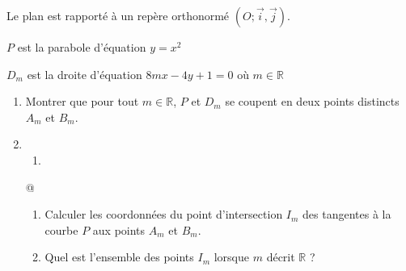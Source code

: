 
%
Le plan est rapporté à un repère orthonormé $\left(O; \vec{i}, \vec{j}\right)$.
\par
$P$ est la parabole d'équation $y=x^{2}$
\par
$D_{m}$ est la droite d'équation $8mx-4y+1=0$ où $m\in \mathbb{R}$
\begin{enumerate}
     \item
     Montrer que pour tout $m\in \mathbb{R}$, $P$ et $D_{m}$ se coupent en deux points distincts $A_{m}$ et $B_{m}$.
     \item

\begin{enumerate}
\item

\end{enumerate}@
     \begin{enumerate}[label=\alph*.]
          \item
          Calculer les coordonnées du point d'intersection $I_{m}$ des tangentes à la courbe $P$ aux points $A_{m}$ et $B_{m}$.
          \item
          Quel est l'ensemble des points $I_{m}$ lorsque $m$ décrit $\mathbb{R}$ ?
     \end{enumerate}
\end{enumerate}
